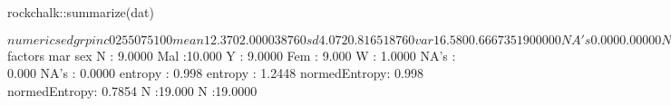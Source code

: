 \begin{Schunk}
\begin{Sinput}
  rockchalk::summarize(dat)
\end{Sinput}
\begin{Soutput}
$numerics
         ed     grp       inc
0%    6.000  1.0000     11110
25%   9.500  1.0000     23170
50%  12.000  2.0000     34330
75%  14.500  3.0000     44390
100% 20.000  3.0000     78790
mean 12.370  2.0000     38760
sd    4.072  0.8165     18760
var  16.580  0.6667 351900000
NA's  0.000  0.0000         0
N    19.000 19.0000        19

$factors
            mar                     sex        
 N            : 9.0000   Mal          :10.000  
 Y            : 9.0000   Fem          : 9.000  
 W            : 1.0000   NA's         : 0.000  
 NA's         : 0.0000   entropy      : 0.998  
 entropy      : 1.2448   normedEntropy: 0.998  
 normedEntropy: 0.7854   N            :19.000  
 N            :19.0000                         
\end{Soutput}
\end{Schunk}
